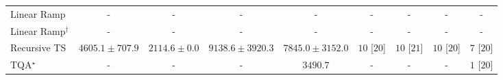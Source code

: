 \begin{tabular}{l|cccc|cccc|}
Linear Ramp & {\cellcolor[HTML]{000000}} \color[HTML]{F1F1F1} {\cellcolor{white}} \color{black} - & {\cellcolor[HTML]{000000}} \color[HTML]{F1F1F1} {\cellcolor{white}} \color{black} - & {\cellcolor[HTML]{000000}} \color[HTML]{F1F1F1} {\cellcolor{white}} \color{black} - & {\cellcolor[HTML]{000000}} \color[HTML]{F1F1F1} {\cellcolor{white}} \color{black} - & {\cellcolor[HTML]{000000}} \color[HTML]{F1F1F1} {\cellcolor{white}} \color{black} - & {\cellcolor[HTML]{000000}} \color[HTML]{F1F1F1} {\cellcolor{white}} \color{black} - & {\cellcolor[HTML]{000000}} \color[HTML]{F1F1F1} {\cellcolor{white}} \color{black} - & {\cellcolor[HTML]{000000}} \color[HTML]{F1F1F1} {\cellcolor{white}} \color{black} - \\
Linear Ramp$^\dagger$ & {\cellcolor[HTML]{000000}} \color[HTML]{F1F1F1} {\cellcolor{white}} \color{black} - & {\cellcolor[HTML]{000000}} \color[HTML]{F1F1F1} {\cellcolor{white}} \color{black} - & {\cellcolor[HTML]{000000}} \color[HTML]{F1F1F1} {\cellcolor{white}} \color{black} - & {\cellcolor[HTML]{000000}} \color[HTML]{F1F1F1} {\cellcolor{white}} \color{black} - & {\cellcolor[HTML]{000000}} \color[HTML]{F1F1F1} {\cellcolor{white}} \color{black} - & {\cellcolor[HTML]{000000}} \color[HTML]{F1F1F1} {\cellcolor{white}} \color{black} - & {\cellcolor[HTML]{000000}} \color[HTML]{F1F1F1} {\cellcolor{white}} \color{black} - & {\cellcolor[HTML]{000000}} \color[HTML]{F1F1F1} {\cellcolor{white}} \color{black} - \\
Recursive TS & {\cellcolor[HTML]{9EBAD9}} \color[HTML]{000000} $4605.1\pm 707.9$ & {\cellcolor[HTML]{F5EFF6}} \color[HTML]{000000} $2114.6\pm 0.0$ & {\cellcolor[HTML]{023858}} \color[HTML]{F1F1F1} $9138.6\pm 3920.3$ & {\cellcolor[HTML]{04629A}} \color[HTML]{F1F1F1} $7845.0\pm 3152.0$ & {\cellcolor[HTML]{49006A}} \color[HTML]{F1F1F1} $10$ [$20$] & {\cellcolor[HTML]{49006A}} \color[HTML]{F1F1F1} $10$ [$21$] & {\cellcolor[HTML]{49006A}} \color[HTML]{F1F1F1} $10$ [$20$] & {\cellcolor[HTML]{CD238F}} \color[HTML]{F1F1F1} $7$ [$20$] \\
TQA$^\star$ & {\cellcolor[HTML]{000000}} \color[HTML]{F1F1F1} {\cellcolor{white}} \color{black} - & {\cellcolor[HTML]{000000}} \color[HTML]{F1F1F1} {\cellcolor{white}} \color{black} - & {\cellcolor[HTML]{000000}} \color[HTML]{F1F1F1} {\cellcolor{white}} \color{black} - & {\cellcolor[HTML]{D1D2E6}} \color[HTML]{000000} $3490.7$ & {\cellcolor[HTML]{000000}} \color[HTML]{F1F1F1} {\cellcolor{white}} \color{black} - & {\cellcolor[HTML]{000000}} \color[HTML]{F1F1F1} {\cellcolor{white}} \color{black} - & {\cellcolor[HTML]{000000}} \color[HTML]{F1F1F1} {\cellcolor{white}} \color{black} - & {\cellcolor[HTML]{FFF7F3}} \color[HTML]{000000} $1$ [$20$] \\

\end{tabular}
